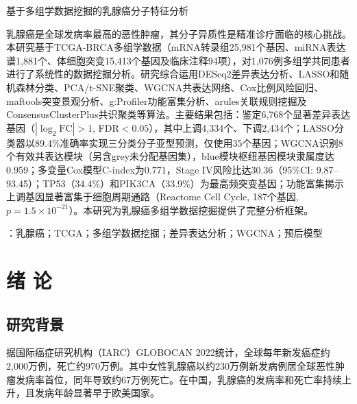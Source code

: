 \documentclass[12pt,a4paper,openany]{ctexbook}
\begin{document}


\setcounter{page}{1}

\begin{center}
{\heiti\Large 基于多组学数据挖掘的乳腺癌分子特征分析}
\end{center}
\vspace{2em}
\noindent 乳腺癌是全球发病率最高的恶性肿瘤，其分子异质性是精准诊疗面临的核心挑战。本研究基于TCGA-BRCA多组学数据（mRNA转录组25,981个基因、miRNA表达谱1,881个、体细胞突变15,413个基因及临床注释94项），对1,076例多组学共同患者进行了系统性的数据挖掘分析。研究综合运用DESeq2差异表达分析、LASSO和随机森林分类、PCA/t-SNE聚类、WGCNA共表达网络、Cox比例风险回归、maftools突变景观分析、g:Profiler功能富集分析、arules关联规则挖掘及ConsensusClusterPlus共识聚类等算法。主要结果包括：鉴定6,768个显著差异表达基因（$|\log_2\text{FC}|>1$, FDR$<0.05$），其中上调4,334个、下调2,434个；LASSO分类器以89.4\%准确率实现三分类分子亚型预测，仅使用35个基因；WGCNA识别8个有效共表达模块（另含grey未分配基因集），blue模块枢纽基因模块隶属度达0.959；多变量Cox模型C-index为0.771，Stage IV风险比达30.36（95\%CI: 9.87--93.45）；TP53（34.4\%）和PIK3CA（33.9\%）为最高频突变基因；功能富集揭示上调基因显著富集于细胞周期通路（Reactome Cell Cycle, 187个基因, $p=1.5\times10^{-21}$）。本研究为乳腺癌多组学数据挖掘提供了完整分析框架。

\vspace{1em}
\vspace{1em}：乳腺癌；TCGA；多组学数据挖掘；差异表达分析；WGCNA；预后模型

\newpage
\tableofcontents
\newpage
\renewcommand{\listfigurename}{图目录}
\listoffigures
\newpage
\renewcommand{\listtablename}{表目录}
\listoftables
\newpage
{}
\setcounter{page}{1}
\chapter{绪 论}

\section{研究背景}
据国际癌症研究机构（IARC）GLOBOCAN 2022统计，全球每年新发癌症约2,000万例，死亡约970万例\cite{sung2024global}。其中女性乳腺癌以约230万例新发病例居全球恶性肿瘤发病率首位，同年导致约67万例死亡。在中国，乳腺癌的发病率和死亡率持续上升，且发病年龄显著早于欧美国家。
\end{document}
